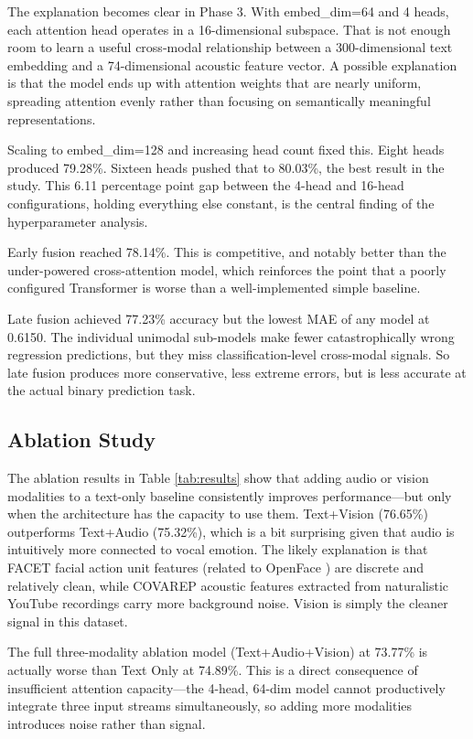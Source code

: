\documentclass[conference]{IEEEtran}
\begin{document}
The explanation becomes clear in Phase 3. With embed\_dim=64 and 4 heads, each attention head operates in a 16-dimensional subspace. That is not enough room to learn a useful cross-modal relationship between a 300-dimensional text embedding and a 74-dimensional acoustic feature vector. A possible explanation is that the model ends up with attention weights that are nearly uniform, spreading attention evenly rather than focusing on semantically meaningful representations.

Scaling to embed\_dim=128 and increasing head count fixed this. Eight heads produced 79.28\%. Sixteen heads pushed that to 80.03\%, the best result in the study. This 6.11 percentage point gap between the 4-head and 16-head configurations, holding everything else constant, is the central finding of the hyperparameter analysis.

Early fusion reached 78.14\%. This is competitive, and notably better than the under-powered cross-attention model, which reinforces the point that a poorly configured Transformer is worse than a well-implemented simple baseline.

Late fusion achieved 77.23\% accuracy but the lowest MAE of any model at 0.6150. The individual unimodal sub-models make fewer catastrophically wrong regression predictions, but they miss classification-level cross-modal signals. So late fusion produces more conservative, less extreme errors, but is less accurate at the actual binary prediction task.

\subsection{Ablation Study}
The ablation results in Table \ref{tab:results} show that adding audio or vision modalities to a text-only baseline consistently improves performance---but only when the architecture has the capacity to use them. Text+Vision (76.65\%) outperforms Text+Audio (75.32\%), which is a bit surprising given that audio is intuitively more connected to vocal emotion. The likely explanation is that FACET facial action unit features (related to OpenFace \cite{baltrusaitis2016openface}) are discrete and relatively clean, while COVAREP acoustic features extracted from naturalistic YouTube recordings carry more background noise. Vision is simply the cleaner signal in this dataset.

The full three-modality ablation model (Text+Audio+Vision) at 73.77\% is actually worse than Text Only at 74.89\%. This is a direct consequence of insufficient attention capacity---the 4-head, 64-dim model cannot productively integrate three input streams simultaneously, so adding more modalities introduces noise rather than signal.
\end{document}
